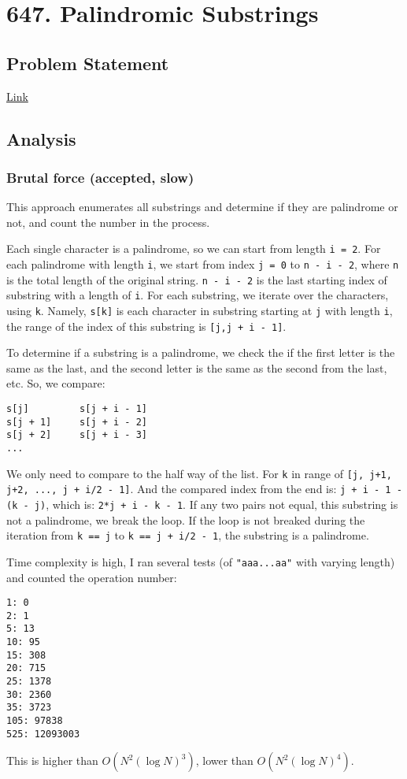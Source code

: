 \documentclass[11pt]{article}
\begin{document}
\section{647. Palindromic Substrings}
\label{sec:org355881a}
\subsection{Problem Statement}
\label{sec:org8940497}
\href{https://leetcode.com/problems/palindromic-substrings/}{Link}
\subsection{Analysis}
\label{sec:orgf203680}
\subsubsection{Brutal force (accepted, slow)}
\label{sec:org6ed90c2}
This approach enumerates all substrings and determine if they are palindrome or not, and count the number in the process.

Each single character is a palindrome, so we can start from length \texttt{i = 2}. For each palindrome with length \texttt{i}, we start from index \texttt{j = 0} to \texttt{n - i - 2}, where \texttt{n} is the total length of the original string. \texttt{n - i - 2} is the last starting index of substring with a length of \texttt{i}. For each substring, we iterate over the characters, using \texttt{k}. Namely, \texttt{s[k]} is each character in substring starting at \texttt{j} with length \texttt{i}, the range of the index of this substring is \texttt{[j,j + i - 1]}.

To determine if a substring is a palindrome, we check the if the first letter is the same as the last, and the second letter is the same as the second from the last, etc. So, we compare:
\begin{Verbatim}[frame=single]
s[j]         s[j + i - 1]
s[j + 1]     s[j + i - 2]
s[j + 2]     s[j + i - 3]
...
\end{Verbatim}
We only need to compare to the half way of the list. For \texttt{k} in range of \texttt{[j, j+1, j+2, ..., j + i/2 - 1]}. And the compared index from the end is: \texttt{j + i - 1 - (k - j)}, which is: \texttt{2*j + i - k - 1}. If any two pairs not equal, this substring is not a palindrome, we break the loop. If the loop is not breaked during the iteration from \texttt{k == j} to \texttt{k == j + i/2 - 1}, the substring is a palindrome.

Time complexity is high, I ran several tests (of \texttt{"aaa...aa"} with varying length) and counted the operation number:
\begin{Verbatim}[frame=single]
1: 0
2: 1
5: 13
10: 95
15: 308
20: 715
25: 1378
30: 2360
35: 3723
105: 97838
525: 12093003
\end{Verbatim}
This is higher than \(O(N^2(\log{N})^3)\), lower than \(O(N^2(\log{N})^4)\). 
\end{document}
